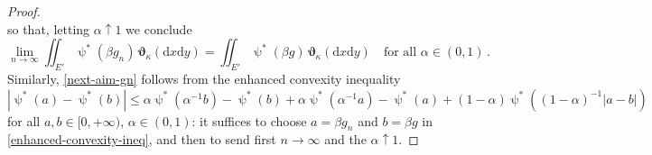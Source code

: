 \documentclass[11pt,reqno]{amsart}
\numberwithin{equation}{section}
\newcommand{\dd}{\mathrm{d}}
\theoremstyle{definition}
\def\dd{\mathrm{d}}
\newcommand{\teta}{\boldsymbol \vartheta}
\newcommand{\tetapi}{\boldsymbol{\teta}_{\kappa}}
\newcommand{\Ed}{{E'}}
\newcommand{\TODOBS}[1]{\todo[inline, color=red!40]{#1}}
\newcommand{\EEE}{\color{black}}
\numberwithin{equation}{section}
\begin{document}
\begin{proof}
\[\]
so that, letting $
\alpha \uparrow 1$ we conclude 
\[
\lim_{n\to\infty} \iint_{\Ed}  \uppsi^*( \beta g_n )  \, \tetapi (\dd x \dd y) =   \iint_{\Ed}  \uppsi^*( \beta g )  \, \tetapi (\dd x \dd y)  \quad \text{for all } \alpha \in (0,1)\,.
\]
Similarly, \eqref{next-aim-gn} follows from the enhanced convexity inequality 
\begin{equation}
\label{enhanced-convexity-ineq}
| \uppsi^*(a ){-} \uppsi^*(b )|  \leq \alpha  \uppsi^*(\alpha^{-1} b) - \uppsi^*(b ) + 
\alpha  \uppsi^*(\alpha^{-1} a) - \uppsi^*(a ) +
(1{-}\alpha)  \uppsi^*((1{-}\alpha)^{-1} |a{-}b|)
\end{equation}
for all $a,b \in [0,+\infty )$, $ \alpha \in (0,1)$: it suffices to choose $a= \beta g_n$ and $b= \beta g$ in  \eqref{enhanced-convexity-ineq}, and then to send first   $n\to \infty$
and the $\alpha 
\uparrow 1$. 



\end{proof}
\end{document}
